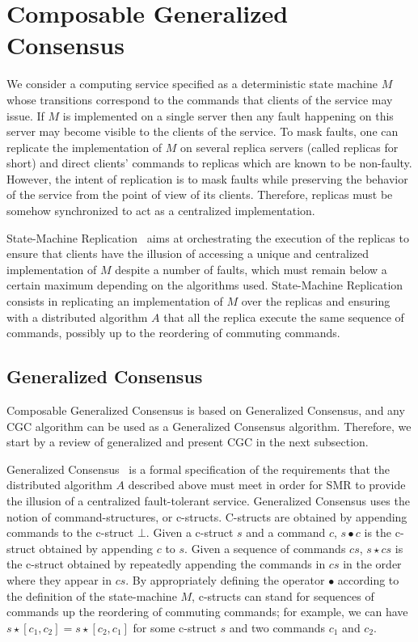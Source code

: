 \section{Composable Generalized Consensus}

We consider a computing service specified as a deterministic state machine $M$ whose transitions correspond to the commands that clients of the service may issue.
If $M$ is implemented on a single server then any fault happening on this server may become visible to the clients of the service.
To mask faults, one can replicate the implementation of $M$ on several replica servers (called replicas for short) and direct clients' commands to replicas which are known to be non-faulty.
However, the intent of replication is to mask faults while preserving the behavior of the service from the point of view of its clients.
Therefore, replicas must be somehow synchronized to act as a centralized implementation.

State-Machine Replication~\cite{Schneider90ImplementingFaulttolerantServicesUsingStateMachine} aims at orchestrating the execution of the replicas to ensure that clients have the illusion of accessing a unique and centralized implementation of $M$ despite a number of faults, which must remain below a certain maximum depending on the algorithms used.
State-Machine Replication consists in replicating an implementation of $M$ over the replicas and ensuring with a distributed algorithm $A$ that all the replica execute the same sequence of commands, possibly up to the reordering of commuting commands.

\subsection{Generalized Consensus}

Composable Generalized Consensus is based on Generalized Consensus, and any CGC algorithm can be used as a Generalized Consensus algorithm. Therefore, we start by a review of generalized and present CGC in the next subsection.

Generalized Consensus~\cite{Lamport05GeneralizeConsensus} is a formal specification of the requirements that the distributed algorithm $A$ described above must meet in order for SMR to provide the illusion of a centralized fault-tolerant service.
Generalized Consensus uses the notion of command-structures, or c-structs. C-structs are obtained by appending commands to the c-struct $\bot$. Given a c-struct $s$ and a command $c$, $s \bullet c$ is the c-struct obtained by appending $c$ to $s$. Given a sequence of commands $cs$, $s\star cs$ is the c-struct obtained by repeatedly appending the commands in $cs$ in the order where they appear in $cs$. By appropriately defining the operator $\bullet$ according to the
definition of the state-machine $M$, c-structs can stand for sequences of commands up the reordering of commuting
commands; for example, we can have $s \star \left[c_1,c_2\right] = s \star \left[c_2,c_1\right]$ for some c-struct $s$ and two commands $c_1$ and $c_2$.

